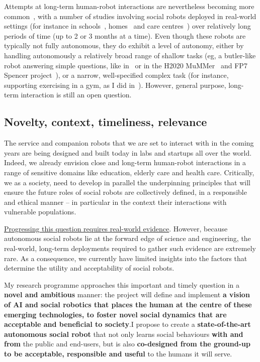 Attempts at long-term human-robot interactions are nevertheless becoming more
common~\parencite{kunze2018artificial,leite2013social}, with a number of studies
involving social robots deployed in real-world settings (for instance in
schools~\parencite{leite2014empathic,westlund2017measuring,
lemaignan2016learning,coninx2016towards}, homes~\parencite{degraaf2017phased} and
care centres~\parencite{hawes2017strands,winkle2020couch}) over relatively long
periods of time (up to 2 or 3 months at a time). Even though these robots are
typically not fully autonomous, they do exhibit a level of autonomy, either by
handling autonomously a relatively broad range of shallow tasks (eg, a
butler-like robot answering simple questions, like in~\textcite{hawes2017strands} or
in the H2020 MuMMer~\parencite{heikkila2018can} and FP7
Spencer project~\parencite{triebel2016spencer}), or a narrow, well-specified complex
task (for instance, supporting exercising in a gym, as I did in~\textcite{winkle2020couch}).
However, general purpose, long-term interaction is still an open question.


\subsection{Novelty, context, timeliness, relevance}

The service and companion robots that we are set to interact with in the coming
years are being designed and built today in labs and startups all over the
world. Indeed, we already envision close and long-term human-robot interactions
in a range of sensitive domains like education, elderly care and health care.
Critically, we as a society, need to develop in parallel the underpinning
principles that will ensure the future roles of social robots are collectively
defined, in a responsible and ethical manner -- in particular in the context
their interactions with vulnerable populations.

\ul{Progressing this question requires real-world evidence}. However, because
autonomous social robots lie at the forward edge of science and engineering, the
real-world, long-term deployments required to gather such evidence are extremely
rare. As a consequence, we currently have limited insights into the factors that
determine the utility and acceptability of social robots.

My research programme approaches this important and timely question in a \textbf{novel and
ambitious} manner: the project will define and implement \textbf{a vision of AI
and social robotics that places the human at the centre of these emerging
technologies, to foster novel social dynamics that are acceptable and beneficial
to society}.I propose to create a \textbf{state-of-the-art autonomous social
robot} that not only learns social behaviours \textbf{with and from} the public
and end-users, but is also \textbf{co-designed from the ground-up to be
acceptable, responsible and useful} to the humans it will serve.

